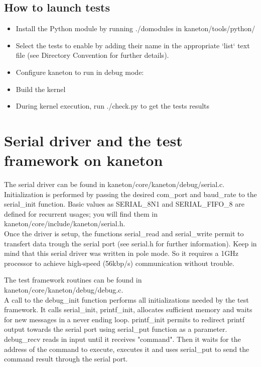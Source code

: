 {\begin{verbatim}
\end{verbatim}


\subsection{How to launch tests}
\begin{itemize}
\item Install the Python module by running ./domodules in kaneton/tools/python/
\item Select the tests to enable by adding their name in the appropriate `list`
text file (see Directory Convention for further details).
\item Configure kaneton to run in debug mode:
\item Build the kernel
\item During kernel execution, run ./check.py to get the tests results
\end{itemize}


\section{Serial driver and the test framework on kaneton}

The serial driver can be found in kaneton/core/kaneton/debug/serial.c.\\
Initialization is performed by passing the desired com\_port and baud\_rate to
the serial\_init function. Basic values as SERIAL\_8N1 and SERIAL\_FIFO\_8 are
defined for recurrent usages; you will find them in
kaneton/core/include/kaneton/serial.h.\\
Once the driver is setup, the functions serial\_read and serial\_write permit
to transfert data trough the serial port (see serial.h for further
information). Keep in mind that this serial driver was written in pole mode. So
it requires a 1GHz processor to achieve high-speed (56kbp/s) communication
without trouble.

The test framework routines can be found in
kaneton/core/kaneton/debug/debug.c.\\
A call to the debug\_init function performs all initializations needed by the
test framework. It calls serial\_init, printf\_init, allocates sufficient memory
and waits for new messages in a never ending loop. printf\_init permits to
redirect printf output towards the serial port using serial\_put function as a
parameter. debug\_recv reads in input until it receives "command". Then it
waits for the address of the command to execute, executes it and uses
serial\_put to send the command result through the serial port.\\


}
